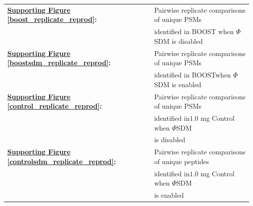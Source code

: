 \documentclass[journal=jprobs,manuscript=article]{achemso}
\begin{document}
\begin{table}[h!]
\begin{tabular}{ll}
        \textbf{\hyperref[boost_replicate_reprod]{Supporting Figure} \ref{boost_replicate_reprod}:} & Pairwise replicate comparisons of unique PSMs  \\
                                                                                                                                                                    &  identified in BOOST when $\Phi$SDM is disabled \\

        \textbf{\hyperref[boostsdm_replicate_reprod]{Supporting Figure} \ref{boostsdm_replicate_reprod}:} & Pairwise replicate comparisons of unique PSMs  \\
                                                                                                                                                                    &  identified in BOOSTwhen $\Phi$SDM is enabled \\

        \textbf{\hyperref[control_replicate_reprod]{Supporting Figure} \ref{control_replicate_reprod}:} & Pairwise replicate comparisons of unique PSMs  \\
                                                                                                                                                                    &  identified in$1.0$ mg Control when $\Phi$SDM\\
                                                                                                                                                                    &  is disabled \\

        \textbf{\hyperref[controlsdm_replicate_reprod]{Supporting Figure} \ref{controlsdm_replicate_reprod}:} & Pairwise replicate comparisons of unique peptides  \\
                                                                                                                                                                    &  identified in$1.0$ mg Control when $\Phi$SDM\\
                                                                                                                                                                    &  is enabled \\

    \end{tabular}
\end{table}

\clearpage
\end{document}
